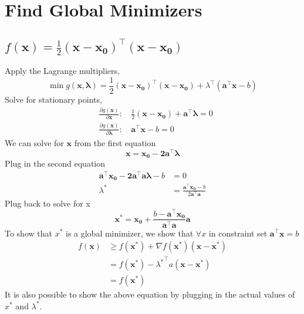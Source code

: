 



\newcommand{\mbf}{\mathbf}
\newcommand{\T}{^\intercal}
\newcommand{\partialgx}{\frac{\partial g(\mathbf{x})}{\partial\mathbf{x}}}
\newcommand{\partialgl}{\frac{\partial g(\mathbf{x})}{\partial\mathbf{\lambda}}}


\section{Find Global Minimizers}

\subsection{$f(\mbf x) = \frac{1}{2} (\mbf{x - x_0})\T (\mbf{x - x_0})$}

Apply the Lagrange multipliers, 
\[
\min g(\mbf{x, \lambda}) = \frac{1}{2} (\mbf{x - x_0})\T (\mbf{x - x_0}) + \lambda^\intercal (\mbf{a^\intercal x}- b)
\]
Solve for stationary points,
\begin{align*}
&\partialgx:\, & \frac{1}{2}(\mbf{x - x_0}) + \mbf{a^\intercal\lambda} = 0 \\
&\partialgl:\, & \mbf{a^\intercal x} - b = 0
\end{align*}
We can solve for $\mbf x$ from the first equation
\[
\mbf{x = x_0 - 2a^\intercal \lambda}
\]
Plug in the second equation
\begin{align*}
\mathbf{a^\intercal x_0 - 2a^\intercal a \lambda} - b &= 0 \\
\lambda^* &= \frac{\mbf{a^\intercal x_0} - b}{2 \mbf{a^\intercal a}}
\end{align*}
Plug back to solve for x
\[
\mbf{x^* = x_0} +  \frac{b - \mbf{a^\intercal x_0}}{\mbf{a^\intercal a}} \mbf{a}
\]
To show that $x^*$ is a global minimizer, we show that $\forall x$ in constraint set $\mbf{a^\intercal x} = b$
\begin{align*}
f(\mbf x) &\geq f(\mbf x^*) + \nabla f(\mbf x^*)(\mbf{x - x^*}) \\
&=  f(\mbf x^*) - {\lambda^*}^\intercal a (\mbf{x - x^*}) \\
&=  f(\mbf x^*) 
\end{align*}
It is also possible to show the above equation by plugging in the actual values of $x^*$ and $\lambda^*$.

